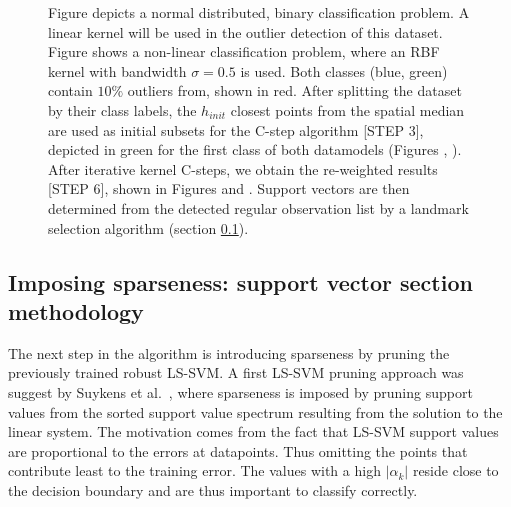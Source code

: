 \documentclass[preprint,12pt]{elsarticle}
\begin{document}
\begin{figure}[!htb]
{			Figure  depicts a normal distributed, binary classification problem. A linear kernel will be used in the outlier detection of this dataset. Figure  shows a non-linear classification problem, where an RBF kernel with bandwidth $\sigma = 0.5$ is used.  Both classes (blue, green) contain $10\%$ outliers from, shown in red. After splitting the dataset by their class labels, the $h_ {init}$ closest points from the spatial median are used as initial subsets for the C-step algorithm [STEP 3], depicted in green for the first class of both datamodels (Figures , ). After iterative kernel C-steps, we obtain the re-weighted results  [STEP 6], shown in Figures  and . Support vectors are then determined from the detected regular observation list by a landmark selection algorithm (section \ref{sec:Sparseness}).}
		\label{fig:C-step}
	\end{figure}
	
	
	\FloatBarrier
	
	\subsection{Imposing sparseness: support vector section methodology}
	\label{sec:Sparseness}
	
	
	The next step in the algorithm is introducing sparseness by pruning the previously trained robust LS-SVM.
	A first LS-SVM pruning approach was suggest by Suykens et al.~\cite{suykens2000sparse}, where  sparseness is imposed by pruning support values from the sorted support value spectrum resulting from the solution to the linear system.  The motivation comes from the fact that LS-SVM support values are proportional to the errors at datapoints. Thus omitting the points that contribute least to the training error. The values with a high $|\alpha_k|$ reside close to the decision boundary and are thus important to classify correctly. 
	
\end{document}

